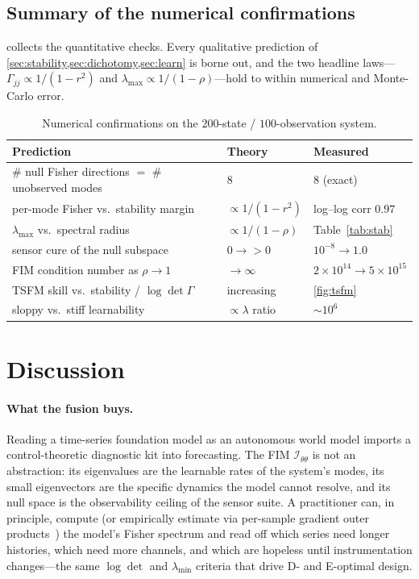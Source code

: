 \documentclass[10pt]{article}
\theoremstyle{plain}
\theoremstyle{definition}
\theoremstyle{remark}
\newcommand{\Fisher}{\mathcal{I}}
\newcommand{\Ith}{\Fisher_{\theta\theta}}
\newcommand{\Gam}{\Gamma}
\begin{document}
\subsection{Summary of the numerical confirmations}
 collects the quantitative checks. Every qualitative
prediction of \cref{sec:stability,sec:dichotomy,sec:learn} is borne out, and the
two headline laws---$\Gam_{jj}\propto1/(1-r^2)$ and
$\lambda_{\max}\propto1/(1-\rho)$---hold to within numerical and Monte-Carlo
error.

\begin{table}[h]
\centering\small
\caption{Numerical confirmations on the $200$-state / $100$-observation system.}
\label{tab:confirm}
\begin{tabular}{@{}p{7.6cm}p{3.0cm}p{3.4cm}@{}}
\toprule
Prediction & Theory & Measured\\
\midrule
\# null Fisher directions $=$ \# unobserved modes & $8$ & $8$ (exact)\\
per-mode Fisher vs.\ stability margin & $\propto1/(1-r^2)$ & log--log corr $0.97$\\
$\lambda_{\max}$ vs.\ spectral radius & $\propto1/(1-\rho)$ & Table~\ref{tab:stab}\\
sensor cure of the null subspace & $0\to>0$ & $10^{-8}\to1.0$\\
FIM condition number as $\rho\!\to\!1$ & $\to\infty$ & $2\!\times\!10^{14}\!\to\!5\!\times\!10^{15}$\\
TSFM skill vs.\ stability / $\log\det\Gam$ & increasing & \cref{fig:tsfm}\\
sloppy vs.\ stiff learnability & $\propto\lambda$ ratio & $\sim\!10^6$\\
\bottomrule
\end{tabular}
\end{table}

\section{Discussion}
\label{sec:discussion}

\paragraph{What the fusion buys.}
Reading a time-series foundation model as an autonomous world model imports a
control-theoretic diagnostic kit into forecasting. The FIM $\Ith$ is not an
abstraction: its eigenvalues are the learnable rates of the system's modes, its
small eigenvectors are the specific dynamics the model cannot resolve, and its
null space is the observability ceiling of the sensor suite. A practitioner can,
in principle, compute (or empirically estimate via per-sample gradient outer
products~\cite[\S12]{wamvla}) the model's Fisher spectrum and read off which
series need longer histories, which need more channels, and which are hopeless
until instrumentation changes---the same $\log\det$ and $\lambda_{\min}$ criteria
that drive D- and E-optimal design.
\end{document}
